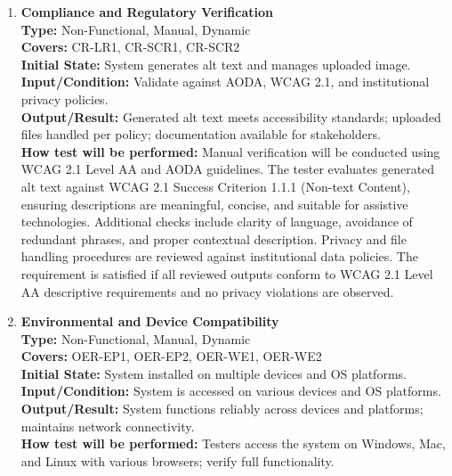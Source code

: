 \documentclass[12pt, titlepage]{article}
\begin{document}
\begin{enumerate}[label=NFR-ST \arabic*., wide=0pt, leftmargin=*]
    \item \textbf{Compliance and Regulatory Verification} \\[2mm]
    \textbf{Type:} Non-Functional, Manual, Dynamic \\
    \textbf{Covers:} CR-LR1, CR-SCR1, CR-SCR2 \\
    \textbf{Initial State:} System generates alt text and manages
    uploaded image. \\
    \textbf{Input/Condition:} Validate against AODA, WCAG 2.1, and
    institutional privacy policies. \\
    \textbf{Output/Result:} Generated alt text meets accessibility
    standards; uploaded files handled per policy; documentation
    available for stakeholders. \\[2mm]
    \textbf{How test will be performed:} Manual verification will be conducted
    using WCAG 2.1 Level AA and AODA guidelines. The tester evaluates generated
    alt text against WCAG 2.1 Success Criterion 1.1.1 (Non-text Content),
    ensuring descriptions are meaningful, concise, and suitable for assistive
    technologies. Additional checks include clarity of language, avoidance of
    redundant phrases, and proper contextual description. Privacy and file
    handling procedures are reviewed against institutional data policies.
    The requirement is satisfied if all reviewed outputs conform to WCAG 2.1
    Level AA descriptive requirements and no privacy violations are observed.

  \item \textbf{Environmental and Device Compatibility} \\[2mm]
    \textbf{Type:} Non-Functional, Manual, Dynamic \\
    \textbf{Covers:} OER-EP1, OER-EP2, OER-WE1, OER-WE2 \\
    \textbf{Initial State:} System installed on multiple devices and
    OS platforms. \\
    \textbf{Input/Condition:} System is accessed on various devices and OS platforms. \\
    \textbf{Output/Result:} System functions reliably across devices and
    platforms; maintains network connectivity. \\[2mm]
    \textbf{How test will be performed:} Testers access the system on
    Windows, Mac, and Linux with various browsers; verify full functionality.


\end{enumerate}
\end{document}
